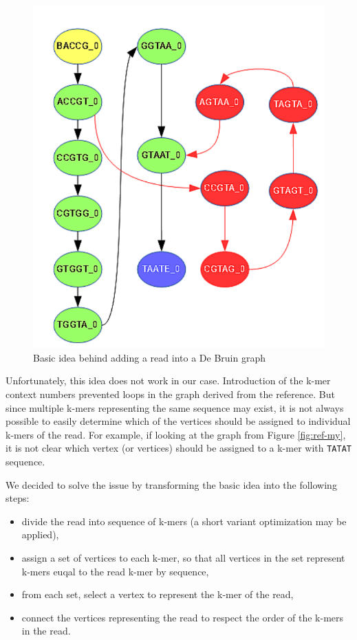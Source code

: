 \begin{figure}
	\centering
	\includegraphics{img/read-idea.pdf}
	\caption{Basic idea behind adding a read into a De Bruin graph}
	\label{fig:read-idea}
\end{figure}

Unfortunately, this idea does not work in our case. Introduction of the k-mer context numbers prevented loops in the graph derived from the reference. But since multiple k-mers representing the same sequence may exist, it is not always possible to easily determine which of the vertices should be assigned to individual k-mers of the read. For example, if looking at the graph from Figure \ref{fig:ref-my}, it is not clear which vertex (or vertices) should be assigned to a k-mer with \texttt{TATAT} sequence. 

We decided to solve the issue by transforming the basic idea into the following steps:
\begin{itemize}
\item divide the read into sequence of k-mers (a short variant optimization may be applied),
\item assign a set of vertices to each k-mer, so that all vertices in the set represent k-mers euqal to the read k-mer by sequence,
\item from each set, select a vertex to represent the k-mer of the read,
\item connect the vertices representing the read to respect the order of the k-mers in the read.
\end{itemize}

